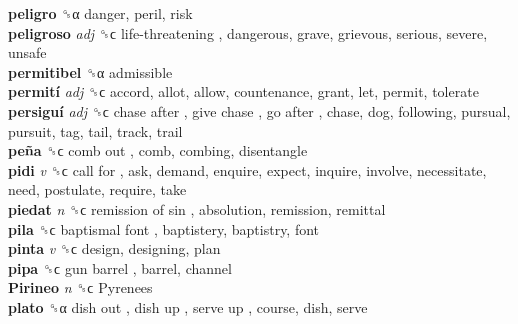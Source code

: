\textbf{peligro} ␝α  danger, peril, risk  \\
\textbf{peligroso} \emph{adj}  ␝ϲ   life-threatening , dangerous, grave, grievous, serious, severe, unsafe  \\
\textbf{permitibel} ␝α  admissible  \\
\textbf{permití} \emph{adj}  ␝ϲ  accord, allot, allow, countenance, grant, let, permit, tolerate  \\
\textbf{persiguí} \emph{adj}  ␝ϲ   chase after ,  give chase ,  go after , chase, dog, following, pursual, pursuit, tag, tail, track, trail  \\
\textbf{peña} ␝ϲ   comb out , comb, combing, disentangle  \\
\textbf{pidi} \emph{v}  ␝ϲ   call for , ask, demand, enquire, expect, inquire, involve, necessitate, need, postulate, require, take  \\
\textbf{piedat} \emph{n}  ␝ϲ   remission of sin , absolution, remission, remittal  \\
\textbf{pila} ␝ϲ   baptismal font , baptistery, baptistry, font  \\
\textbf{pinta} \emph{v}  ␝ϲ  design, designing, plan  \\
\textbf{pipa} ␝ϲ   gun barrel , barrel, channel  \\
\textbf{Pirineo} \emph{n}  ␝ϲ   Pyrenees   \\
\textbf{plato} ␝α   dish out ,  dish up ,  serve up , course, dish, serve  \\

